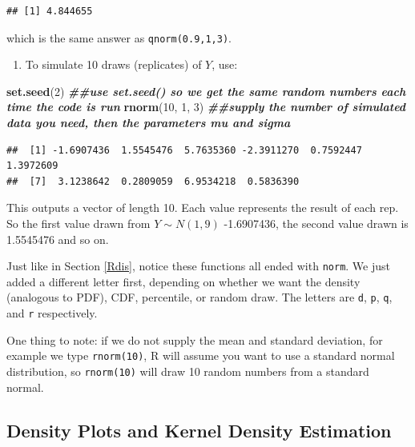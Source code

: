 \documentclass[
]{book}
\newenvironment{Shaded}{\begin{snugshade}}{\end{snugshade}}
\newcommand{\DecValTok}[1]{\textcolor[rgb]{0.00,0.00,0.81}{#1}}
\newcommand{\DocumentationTok}[1]{\textcolor[rgb]{0.56,0.35,0.01}{\textbf{\textit{#1}}}}
\newcommand{\FunctionTok}[1]{\textcolor[rgb]{0.13,0.29,0.53}{\textbf{#1}}}
\newcommand{\NormalTok}[1]{#1}
\providecommand{\tightlist}{%
  \setlength{\itemsep}{0pt}\setlength{\parskip}{0pt}}
\begin{document}
\begin{verbatim}
## [1] 4.844655
\end{verbatim}

which is the same answer as \texttt{qnorm(0.9,1,3)}.

\begin{enumerate}
\def\labelenumi{\arabic{enumi}.}
\setcounter{enumi}{3}
\tightlist
\item
  To simulate 10 draws (replicates) of \(Y\), use:
\end{enumerate}

\begin{Shaded}
\begin{Highlighting}[]
\FunctionTok{set.seed}\NormalTok{(}\DecValTok{2}\NormalTok{) }\DocumentationTok{\#\#use set.seed() so we get the same random numbers each time the code is run}
\FunctionTok{rnorm}\NormalTok{(}\DecValTok{10}\NormalTok{, }\DecValTok{1}\NormalTok{, }\DecValTok{3}\NormalTok{) }\DocumentationTok{\#\#supply the number of simulated data you need, then the parameters mu and sigma}
\end{Highlighting}
\end{Shaded}

\begin{verbatim}
##  [1] -1.6907436  1.5545476  5.7635360 -2.3911270  0.7592447  1.3972609
##  [7]  3.1238642  0.2809059  6.9534218  0.5836390
\end{verbatim}

This outputs a vector of length 10. Each value represents the result of each rep. So the first value drawn from \(Y \sim N(1,9)\) -1.6907436, the second value drawn is 1.5545476 and so on.

Just like in Section \ref{Rdis}, notice these functions all ended with \texttt{norm}. We just added a different letter first, depending on whether we want the density (analogous to PDF), CDF, percentile, or random draw. The letters are \texttt{d}, \texttt{p}, \texttt{q}, and \texttt{r} respectively.

One thing to note: if we do not supply the mean and standard deviation, for example we type \texttt{rnorm(10)}, R will assume you want to use a standard normal distribution, so \texttt{rnorm(10)} will draw 10 random numbers from a standard normal.

\subsection{Density Plots and Kernel Density Estimation}\label{KDE}
\end{document}
